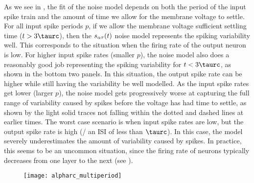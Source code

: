 As we see in ,
the fit of the noise model depends on both the period of the input spike train
and the amount of time we allow for the membrane voltage to settle.
For all input spike periods $p$,
if we allow the membrane voltage sufficient settling time ($t > 3\taurc$),
then the $s_{\alpha\tau}(t)$ noise model represents the spiking variability well.
This corresponds to the situation when the firing rate of the
output neuron is low.
For higher input spike rates (smaller $p$),
the noise model also does a reasonably good job representing
the spiking variability for $t < 3\taurc$,
as shown in the bottom two panels.
In this situation, the output spike rate can be higher
while still having the variability be well modelled.
As the input spike rates get lower (larger $p$),
the noise model gets progressively worse at capturing
the full range of variability caused by spikes
before the voltage has had time to settle,
as shown by the light solid traces not falling
within the dotted and dashed lines at earlier times.
The worst case scenario is when input spike rates are low,
but the output spike rate is high (\ie/ an ISI of less than $\taurc$).
In this case, the model severely underestimates
the amount of variability caused by spikes.
In practice, this seems to be an uncommon situation,
since the firing rate of neurons
typically decreases from one layer to the next (see ).

\begin{figure}
  \centering
  \texttt{[image: alpharc\_multiperiod]}
\end{figure}

